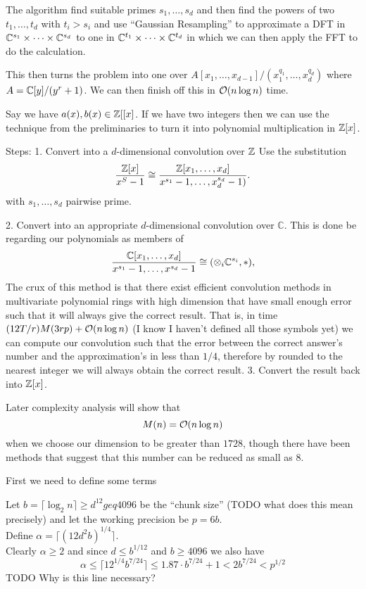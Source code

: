 The algorithm find suitable primes $s_1, \ldots, s_d$ and then find the powers of two $t_1, \ldots, t_d$ with $t_i > s_i$ and use ``Gaussian Resampling'' to approximate a DFT in ${\mathbb C}^{s_1} \times \cdots \times {\mathbb C}^{s_d}$ to one in ${\mathbb C}^{t_1} \times \cdots \times {\mathbb C}^{t_d}$ in which we can then apply the FFT to do the calculation.

This then turns the problem into one over $A[x_1, \ldots, x_{d-1}] / (x_1^{q_1}, \ldots, x_d^{q_d})$ where $A = {\mathbb C}[y] / (y^r + 1)$. We can then finish off this in $\mathcal O(n \log n)$ time.

Say we have $a(x) , b(x) \in {\mathbb Z}[[x]$. If we have two integers then we can use the technique from the preliminaries to turn it into polynomial multiplication in ${\mathbb Z}[x]$.

Steps:
1. Convert into a $d$-dimensional convolution over ${\mathbb Z}$
Use the substitution
\[
  \frac{{\mathbb Z}[x]}{x^S - 1} \cong \frac{{\mathbb Z}[x_1, \ldots, x_d]}{x^{s_1} - 1, \ldots, x_d^{s_d} - 1)}.
\]
with $s_1, \ldots, s_d$ pairwise prime.

2. Convert into an appropriate $d$-dimensional convolution over $\mathbb{C}$.
This is done be regarding our polynomials as members of
\[
  \frac{{\mathbb C}[x_1, \ldots, x_d]}{x^{s_1} - 1, \ldots, x^{s_d} - 1} \cong (\otimes_i {\mathbb C}^{s_i}, \ast),
\]
The crux of this method is that there exist efficient convolution methods in multivariate polynomial rings with high dimension that have small enough error such that it will always give the correct result. That is, in time $(12T/r)M(3rp) + \mathcal O(n\log n)$ (I know I haven't defined all those symbols yet) we can compute our convolution such that the error between the correct answer's number and the approximation's in less than $1 / 4$, therefore by rounded to the nearest integer we will always obtain the correct result.
3. Convert the result back into ${\mathbb Z}[x]$.

Later complexity analysis will show that
\[
  M(n) = \mathcal O(n \log n)
\]
when we choose our dimension to be greater than $1728$, though there have been methods that suggest that this number can be reduced as small as $8$.


First we need to define some terms

Let $b = \lceil \log_2 n\rceil \geq d^{12} geq 4096$ be the ``chunk size'' (TODO what does this mean precisely) and let the working precision be $p = 6b$.\\
Define $\alpha = \lceil (12d^2 b)^{1/4}\rceil$.\\
Clearly $\alpha \geq 2$ and since $d \leq b^{1/12}$ and $b \geq 4096$ we also have
\begin{equation}
    \alpha \leq \lceil 12^{1/4} b^{7/24}\rceil \leq 1.87 \cdot b^{7/24} + 1 < 2b^{7/24} < p^{1/2}
\end{equation}
TODO Why is this line necessary?

